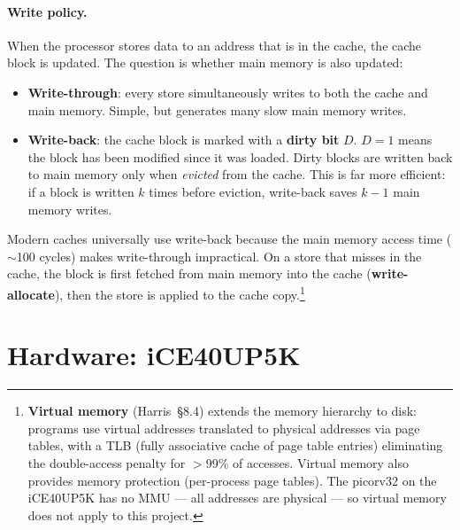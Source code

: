 \documentclass[9pt, a4paper]{extarticle}
\begin{document}
\paragraph{Write policy.} When the processor stores data to an address that is in the cache, the cache block is updated. The question is whether main memory is also updated:

\begin{itemize}
    \item \textbf{Write-through}: every store simultaneously writes to both the cache and main memory. Simple, but generates many slow main memory writes.
    \item \textbf{Write-back}: the cache block is marked with a \textbf{dirty bit} $D$. $D = 1$ means the block has been modified since it was loaded. Dirty blocks are written back to main memory only when \emph{evicted} from the cache. This is far more efficient: if a block is written $k$ times before eviction, write-back saves $k - 1$ main memory writes.
\end{itemize}

Modern caches universally use write-back because the main memory access time ($\sim$100 cycles) makes write-through impractical. On a store that misses in the cache, the block is first fetched from main memory into the cache (\textbf{write-allocate}), then the store is applied to the cache copy.\footnote{\textbf{Virtual memory} (Harris~\S8.4) extends the memory hierarchy to disk: programs use virtual addresses translated to physical addresses via page tables, with a TLB (fully associative cache of page table entries) eliminating the double-access penalty for $>$99\% of accesses. Virtual memory also provides memory protection (per-process page tables). The picorv32 on the iCE40UP5K has no MMU --- all addresses are physical --- so virtual memory does not apply to this project.}

\newpage
\section{Hardware: iCE40UP5K}

\end{document}

